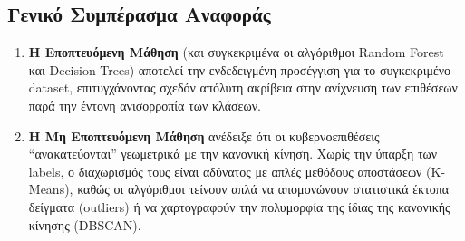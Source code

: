 \documentclass[11pt,a4paper]{article}
\begin{document}
	\subsection{Γενικό Συμπέρασμα Αναφοράς}
	\begin{enumerate}
		\item \textbf{Η Εποπτευόμενη Μάθηση} (και συγκεκριμένα οι αλγόριθμοι Random Forest και Decision Trees) αποτελεί την ενδεδειγμένη προσέγγιση για το συγκεκριμένο dataset, επιτυγχάνοντας σχεδόν απόλυτη ακρίβεια στην ανίχνευση των επιθέσεων παρά την έντονη ανισορροπία των κλάσεων.
		\item \textbf{Η Μη Εποπτευόμενη Μάθηση} ανέδειξε ότι οι κυβερνοεπιθέσεις ``ανακατεύονται'' γεωμετρικά με την κανονική κίνηση. Χωρίς την ύπαρξη των labels, ο διαχωρισμός τους είναι αδύνατος με απλές μεθόδους αποστάσεων (K-Means), καθώς οι αλγόριθμοι τείνουν απλά να απομονώνουν στατιστικά έκτοπα δείγματα (outliers) ή να χαρτογραφούν την πολυμορφία της ίδιας της κανονικής κίνησης (DBSCAN).
	\end{enumerate}
\end{document}
